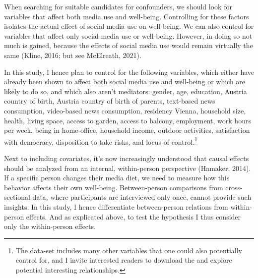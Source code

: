 \documentclass[
  man,mask]{apa7}
\begin{document}
When searching for suitable candidates for confounders, we should look for variables that affect both media use and well-being.
Controlling for these factors isolates the actual effect of social media use on well-being.
We can also control for variables that affect only social media use or well-being.
However, in doing so not much is gained, because the effects of social media use would remain virtually the same (Kline, 2016; but see McElreath, 2021).

In this study, I hence plan to control for the following variables, which either have already been shown to affect both social media use and well-being or which are likely to do so, and which also aren't mediators:
gender, age, education, Austria country of birth, Austria country of birth of parents, text-based news consumption, video-based news consumption, residency Vienna, household size, health, living space, access to garden, access to balcony, employment, work hours per week, being in home-office, household income, outdoor activities, satisfaction with democracy, disposition to take risks, and locus of control.\footnote{The data-set includes many other variables that one could also potentially control for, and I invite interested readers to download the and explore potential interesting relationships.}

Next to including covariates, it's now increasingly understood that causal effects should be analyzed from an internal, within-person perspective (Hamaker, 2014).
If a specific person changes their media diet, we need to measure how this behavior affects their own well-being.
Between-person comparisons from cross-sectional data, where participants are interviewed only once, cannot provide such insights.
In this study, I hence differentiate between-person relations from within-person effects.
And as explicated above, to test the hypothesis I thus consider only the within-person effects.
\end{document}

